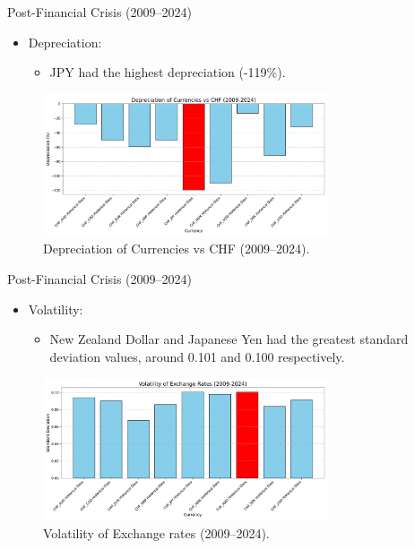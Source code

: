 \documentclass{beamer}
\begin{document}
\begin{frame}{Post-Financial Crisis (2009--2024)}
  \begin{itemize}
    \item Depreciation:
    \begin{itemize}
      \item JPY had the highest depreciation (-119\%).
    \end{itemize}
   \end{itemize}

   \begin{figure}[h!]
    \centering
    \includegraphics[width=0.75\textwidth]{../../images/depreciation_2009_2024.pdf}
    \caption{Depreciation of Currencies vs CHF (2009--2024).}
    \label{fig:depreciation_2009_2024}
\end{figure}
    
\end{frame}


\begin{frame}{Post-Financial Crisis (2009--2024)}
  \begin{itemize}
     \item Volatility:
    \begin{itemize}
      \item  New Zealand Dollar and Japanese Yen had the greatest
standard deviation values, around 0.101 and 0.100 respectively.
    \end{itemize}
   \end{itemize}

    \begin{figure}[h!]
    \centering
    \includegraphics[width=0.75\textwidth]{../../images/volatility_2009_2024.pdf}
    \caption{Volatility of Exchange rates (2009--2024).}
    \label{fig:volatility_2009_2024}
\end{figure}
    
\end{frame}
\end{document}
